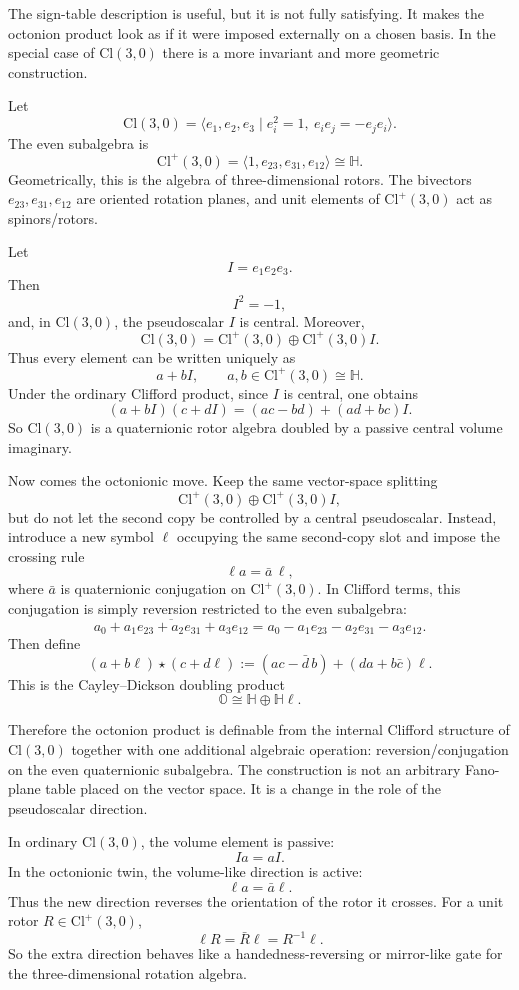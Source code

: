 \documentclass[11pt]{article}
\newcommand{\Cl}{\mathrm{Cl}}
\begin{document}
The sign-table description is useful, but it is not fully satisfying. It
makes the octonion product look as if it were imposed externally on a chosen
basis. In the special case of $\Cl(3,0)$ there is a more invariant and more
geometric construction.

Let
\[
\Cl(3,0)=\langle e_1,e_2,e_3\mid e_i^2=1,\ e_i e_j=-e_j e_i\rangle.
\]
The even subalgebra is
\[
\Cl^+(3,0)=\langle 1,e_{23},e_{31},e_{12}\rangle \cong \mathbb H.
\]
Geometrically, this is the algebra of three-dimensional rotors. The bivectors
$e_{23},e_{31},e_{12}$ are oriented rotation planes, and unit elements of
$\Cl^+(3,0)$ act as spinors/rotors.

Let
\[
I=e_1e_2e_3.
\]
Then
\[
I^2=-1,
\]
and, in $\Cl(3,0)$, the pseudoscalar $I$ is central. Moreover,
\[
\Cl(3,0)=\Cl^+(3,0)\oplus \Cl^+(3,0)I.
\]
Thus every element can be written uniquely as
\[
a+bI,
\qquad a,b\in \Cl^+(3,0)\cong\mathbb H.
\]
Under the ordinary Clifford product, since $I$ is central, one obtains
\[
(a+bI)(c+dI)=(ac-bd)+(ad+bc)I.
\]
So $\Cl(3,0)$ is a quaternionic rotor algebra doubled by a passive central
volume imaginary.

Now comes the octonionic move. Keep the same vector-space splitting
\[
\Cl^+(3,0)\oplus \Cl^+(3,0)I,
\]
but do not let the second copy be controlled by a central pseudoscalar.
Instead, introduce a new symbol $\ell$ occupying the same second-copy slot and
impose the crossing rule
\[
\ell a=\bar a\,\ell,
\]
where $\bar a$ is quaternionic conjugation on $\Cl^+(3,0)$. In Clifford terms,
this conjugation is simply reversion restricted to the even subalgebra:
\[
\overline{a_0+a_1e_{23}+a_2e_{31}+a_3e_{12}}
=
 a_0-a_1e_{23}-a_2e_{31}-a_3e_{12}.
\]
Then define
\[
(a+b\ell)\star(c+d\ell)
:=
(ac-\bar d\,b)+(da+b\bar c)\ell.
\]
This is the Cayley--Dickson doubling product
\[
\mathbb O\cong \mathbb H\oplus \mathbb H\ell.
\]

Therefore the octonion product is definable from the internal Clifford
structure of $\Cl(3,0)$ together with one additional algebraic operation:
reversion/conjugation on the even quaternionic subalgebra. The construction is
not an arbitrary Fano-plane table placed on the vector space. It is a change in
the role of the pseudoscalar direction.

In ordinary $\Cl(3,0)$, the volume element is passive:
\[
Ia=aI.
\]
In the octonionic twin, the volume-like direction is active:
\[
\ell a=\bar a\ell.
\]
Thus the new direction reverses the orientation of the rotor it crosses. For a
unit rotor $R\in\Cl^+(3,0)$,
\[
\ell R=\bar R\ell=R^{-1}\ell.
\]
So the extra direction behaves like a handedness-reversing or mirror-like gate
for the three-dimensional rotation algebra.
\end{document}
